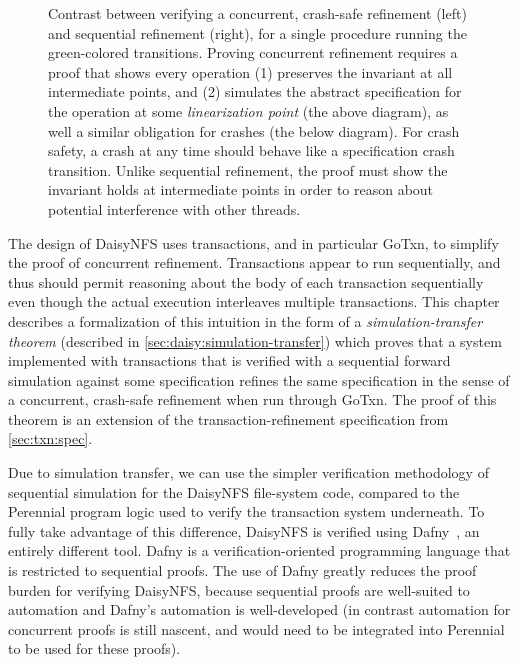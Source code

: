 \begin{figure}
\begin{subfigure}[m]{0.4\textwidth}
  \label{fig:refinement:seq}
  \end{subfigure}
  \caption[Concurrent, crash-safe simulation vs sequential simulation]{Contrast between verifying a
    concurrent, crash-safe refinement (left) and sequential refinement (right), for a single
    procedure running the green-colored transitions. Proving concurrent
    refinement requires a proof that shows every operation (1) preserves the
    invariant at all intermediate points, and (2) simulates the abstract
    specification for the operation at some \emph{linearization point} (the
    above diagram), as well
    a similar obligation for crashes (the below diagram). For
    crash safety, a crash at any time should behave like a specification crash transition. Unlike
    sequential refinement, the proof must show the invariant holds at
    intermediate points in order to reason about potential interference with
    other threads.}

  \label{fig:concurrent-refinement}
\end{figure}


The design of DaisyNFS uses transactions, and in particular GoTxn, to simplify
the proof of concurrent refinement. Transactions appear to run
sequentially, and thus should permit reasoning about the body of each
transaction sequentially even though the actual execution interleaves multiple
transactions. This chapter describes a formalization of this intuition in the
form of a \emph{simulation-transfer theorem} (described in
\cref{sec:daisy:simulation-transfer}) which proves that a system implemented
with transactions that is verified with a sequential forward simulation against
some specification refines the same specification in the sense of a concurrent,
crash-safe refinement when run through GoTxn. The proof of this theorem is an
extension of the transaction-refinement specification from \cref{sec:txn:spec}.

Due to simulation transfer, we can use the simpler verification
methodology of sequential simulation for the DaisyNFS file-system code, compared
to the Perennial program logic used to verify the transaction system underneath.
To fully take advantage of this difference, DaisyNFS is verified using
Dafny~\cite{leino:dafny}, an entirely different tool. Dafny is a
verification-oriented programming language that is restricted to sequential
proofs. The use of Dafny greatly reduces the proof burden for verifying
DaisyNFS, because sequential proofs are well-suited to automation and Dafny's
automation is well-developed (in contrast automation for concurrent proofs is
still nascent, and would need to be integrated into Perennial to be used for
these proofs).

